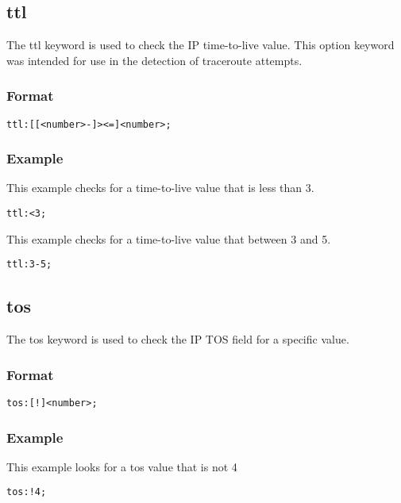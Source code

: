 \documentclass[english]{report}
\begin{document}
\subsection{ttl}

The ttl keyword is used to check the IP time-to-live value.  This option
keyword was intended for use in the detection of traceroute attempts.

\subsubsection{Format}

\begin{verbatim}
ttl:[[<number>-]><=]<number>;
\end{verbatim}

\subsubsection{Example}

This example checks for a time-to-live value that is less than 3.
\begin{verbatim}
ttl:<3;
\end{verbatim}

This example checks for a time-to-live value that between 3 and 5.
\begin{verbatim}
ttl:3-5;
\end{verbatim}

\subsection{tos}

The tos keyword is used to check the IP TOS field for a specific value. 

\subsubsection{Format}

\begin{verbatim}
tos:[!]<number>;
\end{verbatim}

\subsubsection{Example}

This example looks for a tos value that is not 4
\begin{verbatim}
tos:!4;
\end{verbatim}
\end{document}
